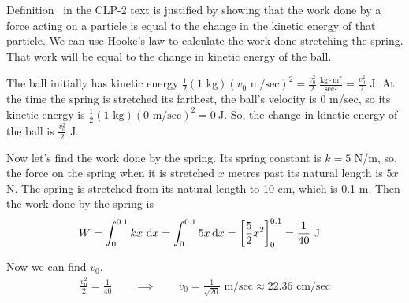 \begin{solution}
Definition~  in the CLP-2 text is justified by showing that the work done by a force acting on a particle is  equal to the change in the kinetic energy of that particle. We can use Hooke's law to calculate the work done stretching the spring. That work will be equal to the change in kinetic energy of the ball.

The ball initially has kinetic energy $\frac{1}{2}(1\text{ kg})(v_0 \text{ m/sec})^2 = \frac{v_0^2}{2}~\frac{\text{kg}\cdot\text{m}^2}{\text{sec}^2} = \frac{v_0^2}{2}\text{ J}$.  At the time the spring is stretched its farthest, the ball's velocity is 0 m/sec, so its kinetic energy is $\frac{1}{2}(1\text{ kg})(0 \text{ m/sec})^2 =0~\text{J}$. So, the change in kinetic energy of the ball is $\frac{v_0^2}{2}$ J.

Now let's find the work done by the spring. Its spring constant is $k=5$ N/m, so, the force on the spring when it is stretched $x$ metres past its natural length is $5x$ N. The spring is stretched from its natural length to 10 cm, which is 0.1 m. Then the work done by the spring is
\begin{align*}
W&=\int_0^{0.1} kx~\mathrm{d}x= \int_0^{0.1} 5x\,\mathrm{d}x = \left[\frac{5}{2}x^2\right]_0^{0.1} = \frac{1}{40} \text{ J}
\end{align*}

Now we can find $v_0$.
\begin{align*}
\frac{v_0^2}{2} =\frac{1}{40} \qquad \implies \qquad v_0 = \frac{1}{\sqrt{20}} \text{ m/sec} \approx 22.36 \text{ cm/sec}
\end{align*}

\end{solution}

